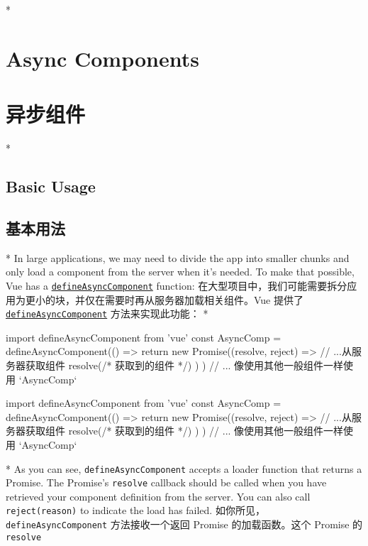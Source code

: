 \begin{paracol}{2}
 
\switchcolumn[0]*%
\section{Async Components}
\switchcolumn
\section{异步组件}
\switchcolumn[0]*%
\subsection{Basic Usage}
\switchcolumn
\subsection{基本用法}
\switchcolumn[0]*%
In large applications, we may need to divide the app into smaller chunks
and only load a component from the server when it's needed. To make that
possible, Vue has a
\href{https://vuejs.org/api/general.html\#defineasynccomponent}{\texttt{defineAsyncComponent}}
function:
\switchcolumn
在大型项目中，我们可能需要拆分应用为更小的块，并仅在需要时再从服务器加载相关组件。Vue
提供了
\href{https://cn.vuejs.org/api/general.html\#defineasynccomponent}{\texttt{defineAsyncComponent}}
方法来实现此功能：
\switchcolumn[0]*%
\begin{codeJs}
import { defineAsyncComponent } from 'vue'
const AsyncComp = defineAsyncComponent(() => {
  return new Promise((resolve, reject) => {
    // ...从服务器获取组件
    resolve(/* 获取到的组件 */)
  })
})
// ... 像使用其他一般组件一样使用 `AsyncComp`
\end{codeJs}
\switchcolumn
\begin{codeJs}
import { defineAsyncComponent } from 'vue'
const AsyncComp = defineAsyncComponent(() => {
  return new Promise((resolve, reject) => {
    // ...从服务器获取组件
    resolve(/* 获取到的组件 */)
  })
})
// ... 像使用其他一般组件一样使用 `AsyncComp`
\end{codeJs}
\switchcolumn[0]*%
As you can see, \texttt{defineAsyncComponent} accepts a loader function
that returns a Promise. The Promise's \texttt{resolve} callback should
be called when you have retrieved your component definition from the
server. You can also call \texttt{reject(reason)} to indicate the load
has failed.
\switchcolumn
如你所见，\texttt{defineAsyncComponent} 方法接收一个返回 Promise
的加载函数。这个 Promise 的 \texttt{resolve}

\end{paracol}

